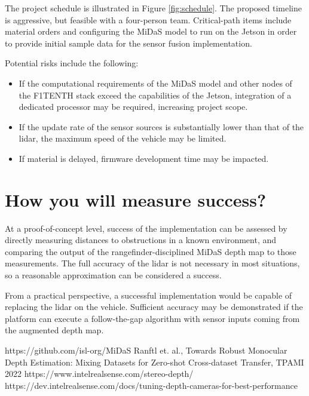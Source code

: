 \documentclass[conference]{IEEEtran}
\begin{document}
The project schedule is illustrated in Figure \ref{fig:schedule}. The proposed
timeline is aggressive, but feasible with a four-person team. Critical-path
items include material orders and configuring the MiDaS model to run on the
Jetson in order to provide initial sample data for the sensor fusion
implementation.

Potential risks include the following:
\begin{itemize}
\item If the computational requirements of the MiDaS model and other nodes of
the F1TENTH stack exceed the capabilities of the Jetson, integration of a
dedicated processor may be required, increasing project scope.

\item If the update rate of the sensor sources is substantially lower than that
of the lidar, the maximum speed of the vehicle may be limited.

\item If material is delayed, firmware development time may be impacted.
\end{itemize}

\FloatBarrier

\section{How you will measure success?}
At a proof-of-concept level, success of the implementation can be assessed
by directly measuring distances to obstructions in a known environment, and
comparing the output of the rangefinder-disciplined MiDaS depth map to those
measurements. The full accuracy of the lidar is not necessary in most
situations, so a reasonable approximation can be considered a success.

From a practical perspective, a successful implementation would be capable of
replacing the lidar on the vehicle. Sufficient accuracy may be demonstrated if
the platform can execute a follow-the-gap algorithm with sensor inputs coming
from the augmented depth map.


\begin{thebibliography}{00}
 https://github.com/isl-org/MiDaS
 Ranftl et. al., Towards Robust Monocular Depth Estimation:
Mixing Datasets for Zero-shot Cross-dataset Transfer, TPAMI 2022
 https://www.intelrealsense.com/stereo-depth/
 https://dev.intelrealsense.com/docs/tuning-depth-cameras-for-best-performance
\end{thebibliography}
\end{document}
